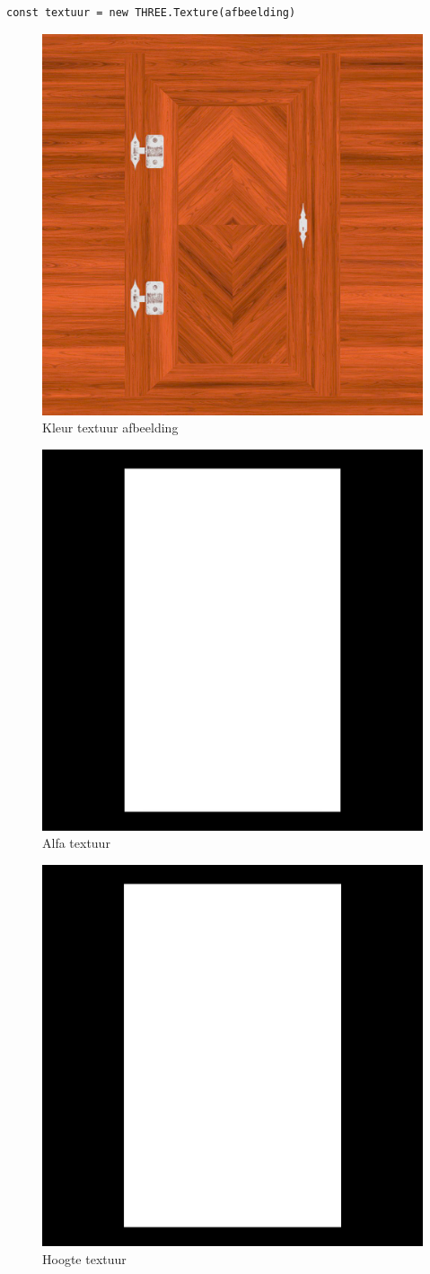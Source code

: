 \begin{lstlisting}
const textuur = new THREE.Texture(afbeelding)
\end{lstlisting}

\begin{figure}[]
	\centering
	\includegraphics[width=.5\linewidth]{graphics/colorTexture}
	\caption[Kleur textuur afbeelding]{Kleur textuur afbeelding}
	\label{fig:colorTexture}
\end{figure}
\begin{figure}[]
	\centering
	\includegraphics[width=.5\linewidth]{graphics/alphaTexture}
	\caption[Alfa textuur]{Alfa textuur}
	\label{fig:alphaTexture}
\end{figure}
\begin{figure}[]
	\centering
	\includegraphics[width=.5\linewidth]{graphics/heightTexture}
	\caption[Hoogte textuur]{Hoogte textuur}
	\label{fig:heightTexture}
\end{figure}
